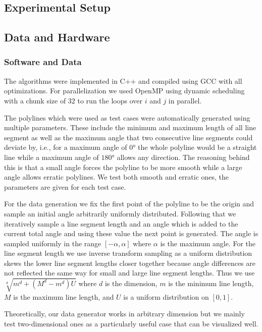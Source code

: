 \subsection{Experimental Setup}
\label{subsec:exp_setup}

\subsection{Data and Hardware}
\label{subsec:hardware}

\subsubsection{Software and Data}
\label{subsubsec:software}
The algorithms were implemented in C++ and compiled using GCC with all optimizations. For parallelization we used OpenMP using dynamic scheduling with a chunk size of \(32\) to run the loops over \(i\) and \(j\) in parallel. 

The polylines which were used as test cases were automatically generated using multiple parameters. These include the minimum and maximum length of all line segment as well as the maximum angle that two consecutive line segments could deviate by, i.e., for a maximum angle of \(0\)° the whole polyline would be a straight line while a maximum angle of \(180\)° allows any direction. The reasoning behind this is that a small angle forces the polyline to be more smooth while a large angle allows erratic polylines. We test both smooth and erratic ones, the parameters are given for each test case. 

For the data generation we fix the first point of the polyline to be the origin and sample an initial angle arbitrarily uniformly distributed. Following that we iteratively sample a line segment length and an angle which is added to the current total angle and using these value the next point is generated. The angle is sampled uniformly in the range \([-\alpha, \alpha]\) where \(\alpha\) is the maximum angle. For the line segment length we use inverse transform sampling as a uniform distribution skews the lower line segment lengths closer together because angle differences are not reflected the same way for small and large line segment lengths. Thus we use \(\sqrt[d]{m^d + (M^d - m^d) U}\) where \(d\) is the dimension, \(m\) is the minimum line length, \(M\) is the maximum line length, and \(U\) is a uniform distribution on \([0,1]\).

Theoretically, our data generator works in arbitrary dimension but we mainly test two-dimensional ones as a particularly useful case that can be visualized well. 

